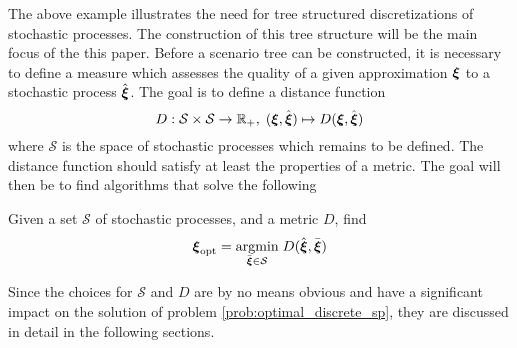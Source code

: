 The above example illustrates the need for tree structured discretizations of stochastic processes. The construction of this tree structure will be the main focus of the this paper. Before a scenario tree can be constructed, it is necessary to define a measure which assesses the quality of a given approximation $\boldsymbol\xi$ to a stochastic process $\hat{\boldsymbol\xi}$. The goal is to define a distance function
\begin{equation}
  \label{eq:distance-function-intro}
  D:\mathcal{S} \times \mathcal{S} \rightarrow \mathbb{R}_+,\;(\boldsymbol\xi, \hat{\boldsymbol\xi})\mapsto D(
\boldsymbol\xi, \hat{\boldsymbol\xi})
\end{equation}
where $\mathcal{S}$ is the space of stochastic processes which remains to be defined. The distance function should satisfy at least the properties of a metric.
The goal will then be to find algorithms that solve the following
\begin{problem}
  \label{prob:optimal_discrete_sp}
  Given a set $\mathcal{S}$ of stochastic processes, and a metric $D$, find
  \begin{equation}
    \label{eq:60}
    \boldsymbol\xi_{\mathrm{opt}} = \underset{\bar{\boldsymbol\xi}\in\mathcal{S}}{\operatorname{argmin}}\; D(\hat{\boldsymbol\xi},\bar{\boldsymbol\xi})
  \end{equation}
\end{problem}
Since the choices for $\mathcal{S}$ and $D$ are by no means obvious and have a significant impact on the solution of problem \ref{prob:optimal_discrete_sp}, they are discussed in detail in the following sections.
